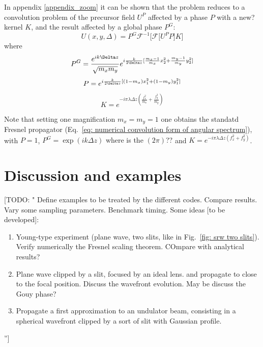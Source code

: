 \documentclass{iucr}              %
\newcommand{\todo}[1]{{\color{red}[TODO: "#1'']}}
\newcommand{\inred}[1]{{\color{red}#1}}
\begin{document}
In appendix \ref{appendix_zoom} it can be shown that the problem reduces to a convolution problem of the precursor field $U^P$ affected by a phase $P$ with a \inred{new?} kernel $K$, and the result affected by a global phase $P^G$: 
\begin{equation}
U(x, y, \Delta) = P^G \mathcal{F}^{-1}\Big[\mathcal{F}\big[U^P P \big] K \Big]
\end{equation}
where
\begin{equation}
P^G =  \frac { e^{ik\Delta z }}{\sqrt{m_x m_y} }e^{i \frac{k}{2 \Delta z} [\frac{m_x - 1}{m_x}x_2^2 + \frac{m_y - 1}{m_y}y_2^2]}  \\
\end{equation}
\begin{equation}
P = e^{i \frac{k}{2 \Delta z} [(1-m_x)x_1^2 + (1-m_y)y_1^2]} \\
\end{equation}
\begin{equation}
K = e^{-i \pi \lambda \Delta z (\frac{f_x^2}{m_x} +\frac{f_y^2}{m_y})}
\end{equation}

Note that setting one magnification $m_x=m_y=1$ one obtains the standatd Fresnel propagator (Eq.~\ref{eq: numerical convolution form of angular spectrum}), with  $P=1$, \inred{$P^G=\exp(i k \Delta z)$ where is the $(2 \pi)$??} and $K= e^{-i \pi \lambda \Delta z (f_x^2 +f_y^2)}$.

\section{Discussion and examples}

\todo{
Define examples to be treated by the different codes. Compare results. Vary some sampling parameters. Benchmark timing. Some ideas [to be developed]: 

\begin{enumerate}
 \item Young-type experiment (plane wave, two slits, like in Fig.~\ref{fig: srw two slits}). Verify numerically the Fresnel scaling theorem. COmpare with analytical results? 
 \item Plane wave clipped by a slit, focused by an ideal lens. and propagate to close to the focal position. Discuss the 
 wavefront evolution. May be discuss the Gouy phase?
 \item Propagate a first approximation to an undulator beam, consisting in a spherical wavefront clipped by a sort of slit with Gaussian profile.  
\end{enumerate}
}
\end{document}
